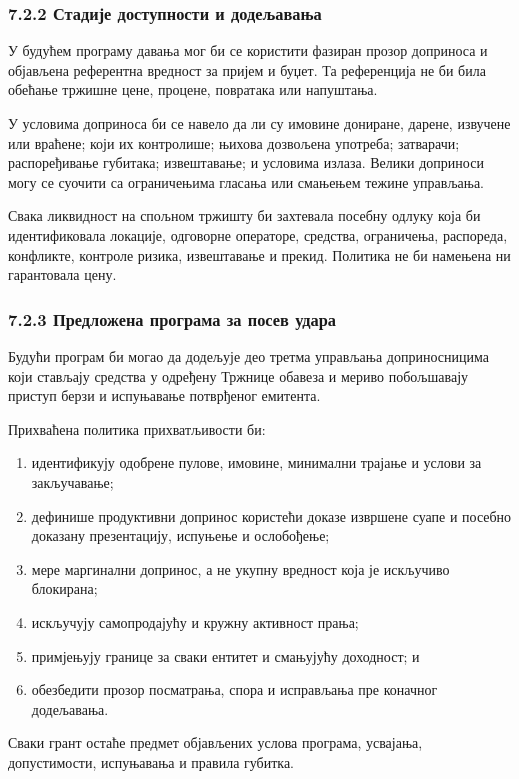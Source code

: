 \documentclass[11pt]{article}
\begin{document}
\subsubsection*{7.2.2 Стадије доступности и додељавања}

У будућем програму давања мог би се користити фазиран прозор доприноса и објављена референтна вредност за пријем и буџет. Та референција не би била обећање тржишне цене, процене, повратака или напуштања.

У условима доприноса би се навело да ли су имовине дониране, дарене, извучене или враћене; који их контролише; њихова дозвољена употреба; затварачи; распоређивање губитака; извештавање; и условима излаза. Велики доприноси могу се суочити са ограничењима гласања или смањењем тежине управљања.

Свака ликвидност на спољном тржишту би захтевала посебну одлуку која би идентификовала локације, одговорне операторе, средства, ограничења, распореда, конфликте, контроле ризика, извештавање и прекид. Политика не би намењена ни гарантовала цену.

\subsubsection*{7.2.3 Предложена програма за посев удара}

Будући програм би могао да додељује део третма управљања доприносницима који стављају средства у одређену Тржнице обавеза и мериво побољшавају приступ берзи и испуњавање потврђеног емитента.

Прихваћена политика прихватљивости би:

\begin{enumerate}[leftmargin=*]
\item идентификују одобрене пулове, имовине, минимални трајање и услови за закључавање;
\item дефинише продуктивни допринос користећи доказе извршене суапе и посебно доказану презентацију, испуњење и ослобођење;
\item мере маргинални допринос, а не укупну вредност која је искључиво блокирана;
\item искључују самопродајућу и кружну активност прања;
\item примјењују границе за сваки ентитет и смањујућу доходност; и
\item обезбедити прозор посматрања, спора и исправљања пре коначног додељавања.
\end{enumerate}
Сваки грант остаће предмет објављених услова програма, усвајања, допустимости, испуњавања и правила губитка.
\end{document}
